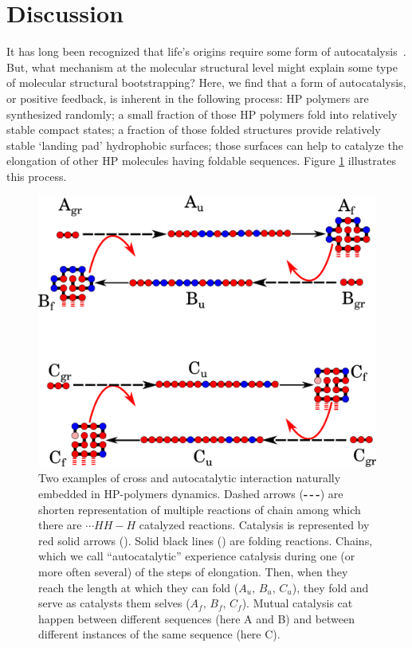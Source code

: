\documentclass[journal=jacsat,manuscript=article,layout=twocolumn]{achemso}
\newcommand*{\red}[1]{\textcolor{red}{#1}}
\begin{document}
\section{Discussion}
\label{sec:evolution}
 It has long been recognized that life's origins require some form of 
 autocatalysis~\cite{Kauffman1986,Dyson1985,Eigen1978}.  But, what mechanism at the molecular 
structural level might explain some type of molecular structural bootstrapping?  Here, we find that 
a form of autocatalysis, or positive feedback, is inherent in the following process:  HP polymers 
are synthesized randomly; a small fraction of those HP polymers fold into relatively stable compact 
states; a fraction of those folded structures provide relatively stable `landing pad' hydrophobic 
surfaces; those surfaces can help to catalyze the elongation of other HP molecules having foldable 
sequences.  Figure \ref{fig:kinExamples} illustrates this process.
\begin{figure}[h!]
  \centering
  \includegraphics[width=0.9\columnwidth]{pictures/catalysis-kinEx-all.pdf}
  \caption{\footnotesize{Two examples of cross and autocatalytic interaction naturally embedded in 
HP-polymers dynamics. Dashed arrows (\textbf{-\,-\,-}) are shorten representation of multiple 
reactions of chain among which there are $\cdots HH - H$ catalyzed reactions. Catalysis is 
represented by red solid arrows (\red{\textbf{\textemdash}}). Solid black lines 
(\textbf{\textemdash}) are folding reactions. Chains, which we call ``autocatalytic'' experience 
catalysis during one (or more often several) of the steps of elongation. Then, when they reach the 
length at which they can fold ($A_u,\, B_u,\, C_u$), they fold and serve as catalysts them selves 
($A_f,\, B_f,\, C_f$). Mutual catalysis cat happen between different sequences (here A and B) and 
between different instances of the same sequence (here C).}}
  \label{fig:kinExamples}
\end{figure}
\end{document}
